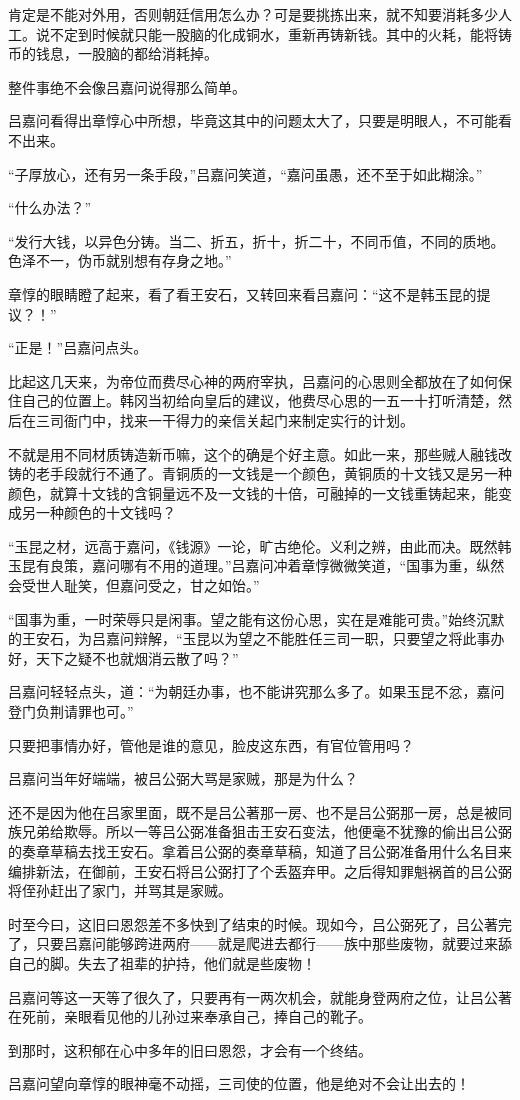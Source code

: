肯定是不能对外用，否则朝廷信用怎么办？可是要挑拣出来，就不知要消耗多少人工。说不定到时候就只能一股脑的化成铜水，重新再铸新钱。其中的火耗，能将铸币的钱息，一股脑的都给消耗掉。

整件事绝不会像吕嘉问说得那么简单。

吕嘉问看得出章惇心中所想，毕竟这其中的问题太大了，只要是明眼人，不可能看不出来。

“子厚放心，还有另一条手段，”吕嘉问笑道，“嘉问虽愚，还不至于如此糊涂。”

“什么办法？”

“发行大钱，以异色分铸。当二、折五，折十，折二十，不同币值，不同的质地。色泽不一，伪币就别想有存身之地。”

章惇的眼睛瞪了起来，看了看王安石，又转回来看吕嘉问：“这不是韩玉昆的提议？！”

“正是！”吕嘉问点头。

比起这几天来，为帝位而费尽心神的两府宰执，吕嘉问的心思则全都放在了如何保住自己的位置上。韩冈当初给向皇后的建议，他费尽心思的一五一十打听清楚，然后在三司衙门中，找来一干得力的亲信关起门来制定实行的计划。

不就是用不同材质铸造新币嘛，这个的确是个好主意。如此一来，那些贼人融钱改铸的老手段就行不通了。青铜质的一文钱是一个颜色，黄铜质的十文钱又是另一种颜色，就算十文钱的含铜量远不及一文钱的十倍，可融掉的一文钱重铸起来，能变成另一种颜色的十文钱吗？

“玉昆之材，远高于嘉问，《钱源》一论，旷古绝伦。义利之辨，由此而决。既然韩玉昆有良策，嘉问哪有不用的道理。”吕嘉问冲着章惇微微笑道，“国事为重，纵然会受世人耻笑，但嘉问受之，甘之如饴。”

“国事为重，一时荣辱只是闲事。望之能有这份心思，实在是难能可贵。”始终沉默的王安石，为吕嘉问辩解，“玉昆以为望之不能胜任三司一职，只要望之将此事办好，天下之疑不也就烟消云散了吗？”

吕嘉问轻轻点头，道：“为朝廷办事，也不能讲究那么多了。如果玉昆不忿，嘉问登门负荆请罪也可。”

只要把事情办好，管他是谁的意见，脸皮这东西，有官位管用吗？

吕嘉问当年好端端，被吕公弼大骂是家贼，那是为什么？

还不是因为他在吕家里面，既不是吕公著那一房、也不是吕公弼那一房，总是被同族兄弟给欺辱。所以一等吕公弼准备狙击王安石变法，他便毫不犹豫的偷出吕公弼的奏章草稿去找王安石。拿着吕公弼的奏章草稿，知道了吕公弼准备用什么名目来编排新法，在御前，王安石将吕公弼打了个丢盔弃甲。之后得知罪魁祸首的吕公弼将侄孙赶出了家门，并骂其是家贼。

时至今曰，这旧曰恩怨差不多快到了结束的时候。现如今，吕公弼死了，吕公著完了，只要吕嘉问能够跨进两府——就是爬进去都行——族中那些废物，就要过来舔自己的脚。失去了祖辈的护持，他们就是些废物！

吕嘉问等这一天等了很久了，只要再有一两次机会，就能身登两府之位，让吕公著在死前，亲眼看见他的儿孙过来奉承自己，捧自己的靴子。

到那时，这积郁在心中多年的旧曰恩怨，才会有一个终结。

吕嘉问望向章惇的眼神毫不动摇，三司使的位置，他是绝对不会让出去的！

